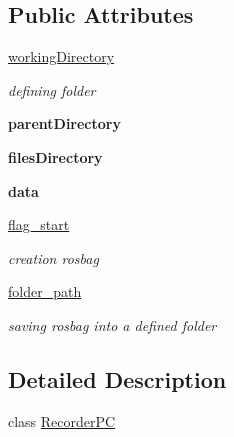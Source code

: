 \subsection*{Public Attributes}
\begin{DoxyCompactItemize}
\item 
\hyperlink{classRecorder__PC_1_1RecorderPC_a2286df16f6de1a1e301abe29040910a1}{working\+Directory}\hypertarget{classRecorder__PC_1_1RecorderPC_a2286df16f6de1a1e301abe29040910a1}{}\label{classRecorder__PC_1_1RecorderPC_a2286df16f6de1a1e301abe29040910a1}

\begin{DoxyCompactList}\small\item\em defining folder \end{DoxyCompactList}\item 
{\bfseries parent\+Directory}\hypertarget{classRecorder__PC_1_1RecorderPC_ae8c8642b704ce3584c15c50ba2cf420e}{}\label{classRecorder__PC_1_1RecorderPC_ae8c8642b704ce3584c15c50ba2cf420e}

\item 
{\bfseries files\+Directory}\hypertarget{classRecorder__PC_1_1RecorderPC_adb58428a92cd66e5cc1a73bb762976d4}{}\label{classRecorder__PC_1_1RecorderPC_adb58428a92cd66e5cc1a73bb762976d4}

\item 
{\bfseries data}\hypertarget{classRecorder__PC_1_1RecorderPC_af4e73c9d38c2e11d0a4fa09be3deebc5}{}\label{classRecorder__PC_1_1RecorderPC_af4e73c9d38c2e11d0a4fa09be3deebc5}

\item 
\hyperlink{classRecorder__PC_1_1RecorderPC_aff33d03c0a4ccab6d6a6b474af57592e}{flag\+\_\+start}
\begin{DoxyCompactList}\small\item\em creation rosbag \end{DoxyCompactList}\item 
\hyperlink{classRecorder__PC_1_1RecorderPC_a4ea59328e25a40d2b28abb963cbaf7f9}{folder\+\_\+path}\hypertarget{classRecorder__PC_1_1RecorderPC_a4ea59328e25a40d2b28abb963cbaf7f9}{}\label{classRecorder__PC_1_1RecorderPC_a4ea59328e25a40d2b28abb963cbaf7f9}

\begin{DoxyCompactList}\small\item\em saving rosbag into a defined folder \end{DoxyCompactList}\end{DoxyCompactItemize}


\subsection{Detailed Description}
class \hyperlink{classRecorder__PC_1_1RecorderPC}{Recorder\+PC} 

